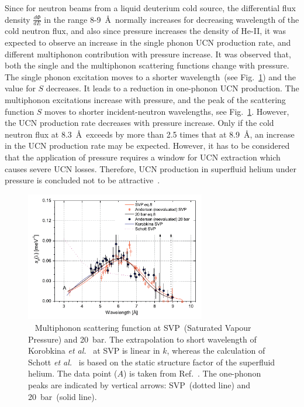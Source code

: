 Since for neutron beams from a liquid deuterium cold source, the
differential flux density $\frac{d\Phi}{dE}$ in the range
8-9~\AA~normally increases for decreasing wavelength of the cold
neutron flux, and also since pressure increases the density of He-II,
it was expected to observe an increase in the single phonon UCN
production rate, and different multiphonon contribution with pressure
increase.  It was observed that, both the single and the multiphonon
scattering functions change with pressure. The single phonon
excitation moves to a shorter wavelength~(see
Fig.~\ref{fig:Schmidt_S}) and the value for $S$ decreases. It leads to
a reduction in one-phonon UCN production.  The multiphonon excitations
increase with pressure, and the peak of the scattering function $S$
moves to shorter incident-neutron wavelengths, see
Fig.~\ref{fig:Schmidt_S}. However, the UCN production rate decreases
with pressure increase.  Only if the cold neutron flux at
8.3~\AA~exceeds by more than 2.5 times that at 8.9~\AA, an increase in
the UCN production rate may be expected. However, it has to be
considered that the application of pressure requires a window for UCN
extraction which causes severe UCN losses. Therefore, UCN production
in superfluid helium under pressure is concluded not to be
attractive~\cite{Schmidt2009}.




\begin{figure}[h!]
\begin{center}
   \includegraphics[width=0.7\textwidth]{Schmidt_S.PNG}
   \caption{~\cite{Schmidt2009} Multiphonon scattering function at
     SVP~(Saturated Vapour Pressure) and 20~bar. The extrapolation to
     short wavelength of Korobkina {\it {et al.}}~\cite{Korobkina2002}
     at SVP is linear in $k$, whereas the calculation of Schott {\it
       {et al.}}~\cite{Schott2003} is based on the static structure
     factor of the superfluid helium. The data point ($A$) is taken
     from Ref.~\cite{Fak1991}. The one-phonon peaks are indicated by
     vertical arrows: SVP~(dotted line) and 20~bar~(solid line).  }
    \label{fig:Schmidt_S}
    \end{center}
\end{figure} 


